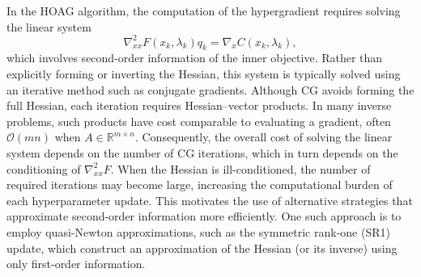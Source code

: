 \documentclass[11pt, twoside]{report}
\begin{document}
In the HOAG algorithm, the computation of the hypergradient requires
solving the linear system
\[
\nabla^2_{xx} F(x_k,\lambda_k) q_k
= \nabla_x C(x_k,\lambda_k),
\]
which involves second-order information of the inner objective. Rather than explicitly forming or inverting the Hessian, this system is typically solved using an iterative method such as conjugate gradients. Although CG avoids forming the full Hessian, each iteration requires Hessian--vector products. In many inverse problems, such products have cost comparable to evaluating a gradient, often $\mathcal{O}(mn)$ when $A \in \mathbb{R}^{m \times n}$. Consequently, the overall cost of solving the linear system depends on the number of CG iterations, which in turn depends on the conditioning of $\nabla^2_{xx} F$. When the Hessian is ill-conditioned, the number of required iterations may become large, increasing the computational burden of each hyperparameter update. This motivates the use of alternative strategies that approximate second-order information more efficiently. One such approach is to employ quasi-Newton approximations, such as the symmetric rank-one (SR1) update, which construct an approximation of the Hessian (or its inverse) using only first-order information.
\end{document}
